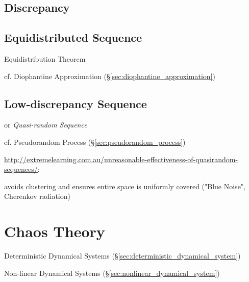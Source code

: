 \subsection{Discrepancy}\label{sec:discrepancy}

\subsection{Equidistributed Sequence}\label{sec:equidistributed_sequence}


Equidistribution Theorem

cf. Diophantine Approximation (\S\ref{sec:diophantine_approximation})



\subsection{Low-discrepancy Sequence}\label{sec:low_discrepancy}

or \emph{Quasi-random Sequence}

cf. Pseudorandom Process (\S\ref{sec:pseudorandom_process})

\url{http://extremelearning.com.au/unreasonable-effectiveness-of-quasirandom-sequences/}:

avoids clustering and ensures entire space is uniformly covered ("Blue Noise",
Cherenkov radiation)



\section{Chaos Theory}\label{sec:chaos_theory}

Deterministic Dynamical Systems (\S\ref{sec:deterministic_dynamical_system})

Non-linear Dynamical Systems (\S\ref{sec:nonlinear_dynamical_system})

